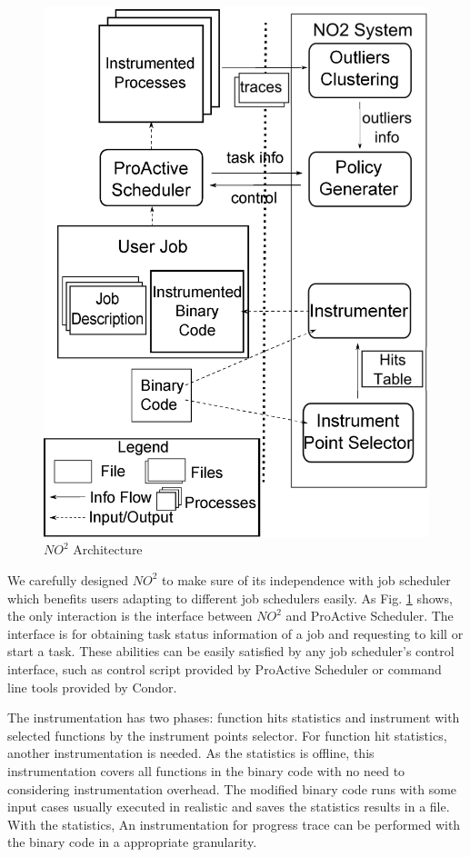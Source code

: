 \begin{figure}
\centering
\includegraphics[width=0.9\columnwidth]{figures/NO2_arch.eps}
\caption{$NO^2$ Architecture}
\label{figure:no2arch}
\end{figure}

We carefully designed $NO^2$ to make sure of its independence with job scheduler which benefits users adapting to different job schedulers easily. As Fig. \ref{figure:no2arch} shows, the only interaction is the interface between $NO^2$ and ProActive Scheduler. The interface is for obtaining task status information of a job and requesting to kill or start a task. These abilities can be easily satisfied by any job scheduler's control interface, such as control script provided by ProActive Scheduler or command line tools provided by Condor.

The instrumentation has two phases: function hits statistics and instrument with selected functions by the instrument points selector. For function hit statistics, another instrumentation is needed. As the statistics is offline, this instrumentation covers all functions in the binary code with no need to considering instrumentation overhead. The modified binary code runs with some input cases usually executed in realistic and saves the statistics results in a file. With the statistics, An instrumentation for progress trace can be performed with the binary code in a appropriate granularity.

